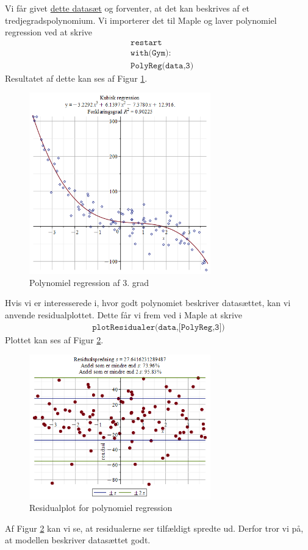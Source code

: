 \begin{exa}
	Vi får givet \href{https://github.com/ChristianJLex/TeachingNotes/raw/master/2023-2024/Data og lign/poly_example.xlsx}{\color{blue!60} dette datasæt} og forventer, at det kan beskrives af 
	et tredjegradspolynomium. Vi importerer det til Maple og laver polynomiel regression ved at 
	skrive
	\begin{align*}
		&\texttt{restart}\\
		&\texttt{with(Gym):}\\
		&\texttt{PolyReg(data,3)}
	\end{align*}
	Resultatet af dette kan ses af Figur \ref{fig:polyreg}.
	\begin{figure}[H]
		\centering
		\includegraphics[width=0.7\textwidth]{Billeder/polyreg2}
		\caption{Polynomiel regression af 3. grad}
		\label{fig:polyreg}
	\end{figure}
	Hvis vi er interesserede i, hvor godt polynomiet beskriver datasættet, kan vi anvende 
	residualplottet. Dette får vi frem ved i Maple at skrive
	\begin{align*}
		\texttt{plotResidualer(data,[PolyReg,3])}
	\end{align*}
	Plottet kan ses af Figur \ref{fig:polyresidual}.
	\begin{figure}[H]
		\centering
		\includegraphics[width=0.7\textwidth]{Billeder/polyresidual}
		\caption{Residualplot for polynomiel regression}
		\label{fig:polyresidual}
	\end{figure}
	Af Figur \ref{fig:polyresidual} kan vi se, at residualerne ser tilfældigt spredte ud. 
	Derfor tror vi på, at modellen beskriver datasættet godt. 
\end{exa}

